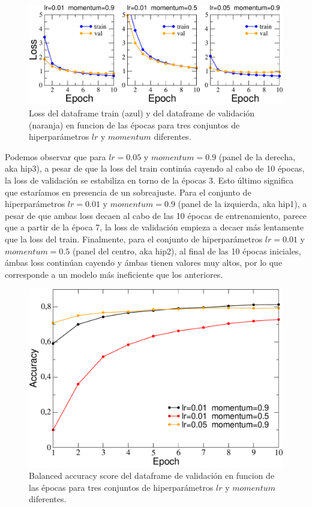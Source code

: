\documentclass[a4paper,10pt]{article}
\begin{document}
\begin{figure}[h]
\centering
\includegraphics[scale=0.5]{data/loss-MLP.pdf}
\caption{Loss del dataframe train (azul) y del dataframe de validación (naranja) en funcion de las épocas para tres conjuntos de hiperparámetros $lr$ y $momentum$ diferentes.}
\label{fig01}
\end{figure}

Podemos observar que para $lr=0.05$ y $momentum=0.9$ (panel de la derecha, aka hip3), a pesar de que la loss del train continúa cayendo al cabo de 10 épocas, la loss de validación se estabiliza en torno de la épocas 3. Esto último significa que estaríamos en presencia de un sobreajuste. Para el conjunto de hiperparámetros $lr=0.01$ y $momentum=0.9$ (panel de la izquierda, aka hip1), a pesar de que ambas loss decaen al cabo de las 10 épocas de entrenamiento, parece que a partir de la época 7, la loss de validación empieza a decaer más lentamente que la loss del train. Finalmente, para el conjunto de hiperparámetros $lr=0.01$ y $momentum=0.5$ (panel del centro, aka hip2), al final de las 10 épocas iniciales, ámbas loss continúan cayendo y ámbas tienen valores muy altos, por lo que corresponde a un modelo más ineficiente que los anteriores. 

\begin{figure}[h]
\centering
\includegraphics[scale=0.35]{data/accuracy-MLP.pdf}
\caption{Balanced accuracy score del dataframe de validación en funcion de las épocas para tres conjuntos de hiperparámetros $lr$ y $momentum$ diferentes.}
\label{fig02}
\end{figure}
\end{document}
